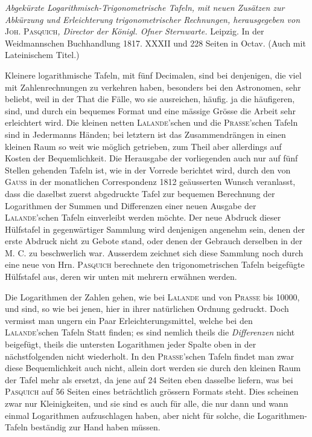 \textit{Abgekürzte Logarithmisch-Trigonometrische Tafeln, mit neuen Zusätzen zur
Abkürzung und Erleichterung trigonometrischer Rechnungen, herausgegeben von }\textsc{Joh.}
\textsc{Pasquich}\textit{, Director der Königl. Ofner Sternwarte.} Leipzig. In der Weidmannschen
Buchhandlung 1817. XXXII und 228 Seiten in Octav. (Auch mit Lateinischem Titel.)
\par{}
Kleinere logarithmische Tafeln, mit fünf Decimalen, sind bei denjenigen,
die viel mit Zahlenrechnungen zu verkehren haben, besonders bei den Astronomen, sehr beliebt, weil in der That die Fälle, wo sie ausreichen, häufig. ja die häufigeren, sind, und durch ein bequemes Format und eine mässige Grösse die Arbeit
sehr erleichtert wird. Die kleinen netten \textsc{Lalande}'schen und die \textsc{Prasse}'schen
Tafeln sind in Jedermanns Händen; bei letztern ist das Zusammendrängen in einen kleinen Raum so weit wie möglich getrieben, zum Theil aber allerdings auf
Kosten der Bequemlichkeit. Die Herausgabe der vorliegenden auch nur auf fünf
Stellen gehenden Tafeln ist, wie in der Vorrede berichtet wird, durch den von
\textsc{Gauss} in der monatlichen Correspondenz 1812 geäusserten Wunsch veranlasst,
dass die daselbst zuerst abgedruckte Tafel zur bequemen Berechnung der Logarithmen der Summen und Differenzen einer neuen Ausgabe der \textsc{Lalande}'schen Tafeln einverleibt werden möchte. Der neue Abdruck dieser Hülfstafel in gegenwärtiger Sammlung wird denjenigen angenehm sein, denen der erste Abdruck
nicht zu Gebote stand, oder denen der Gebrauch derselben in der M. C. zu beschwerlich war. Ausserdem zeichnet sich diese Sammlung noch durch eine neue
von Hrn. \textsc{Pasquich} berechnete den trigonometrischen Tafeln beigefügte Hülfstafel aus, deren wir unten mit mehrern erwähnen werden.

Die Logarithmen der Zahlen gehen, wie bei \textsc{Lalande} und von \textsc{Prasse} bis
10000, und sind, so wie bei jenen, hier in ihrer natürlichen Ordnung gedruckt.
Doch vermisst man ungern ein Paar Erleichterungsmittel, welche bei den \textsc{Lalande}'schen Tafeln Statt finden; es sind nemlich theils die \textit{Differenzen} nicht beigefügt, theils die untersten Logarithmen jeder Spalte oben in der nächstfolgenden
nicht wiederholt. In den \textsc{Prasse}'schen Tafeln findet man zwar diese Bequemlichkeit auch nicht, allein dort werden sie durch den kleinen Raum der Tafel mehr
als ersetzt, da jene auf 24 Seiten eben dasselbe liefern, was bei \textsc{Pasquich} auf 56
Seiten eines beträchtlich grössern Formats steht. Dies scheinen zwar nur Kleinigkeiten, und sie sind es auch für alle, die nur dann und wann einmal Logarithmen aufzuschlagen haben, aber nicht für solche, die Logarithmen-Tafeln beständig zur Hand haben müssen.


